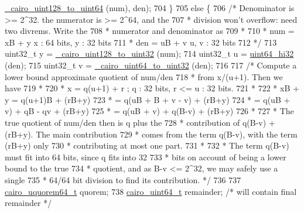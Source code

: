 \begin{DoxyCode}
      \hyperlink{cairo-wideint-private_8h_a9a76ef52b513bb1b8dad9c401d707084}{\_cairo\_uint128\_to\_uint64} (num), den);
704     \}
705     \textcolor{keywordflow}{else} \{
706         \textcolor{comment}{/* Denominator is >= 2^32. the numerator is >= 2^64, and the}
707 \textcolor{comment}{         * division won't overflow: need two divrems.  Write the}
708 \textcolor{comment}{         * numerator and denominator as}
709 \textcolor{comment}{         *}
710 \textcolor{comment}{         *      num = xB + y            x : 64 bits, y : 32 bits}
711 \textcolor{comment}{         *      den = uB + v            u, v : 32 bits}
712 \textcolor{comment}{         */}
713         uint32\_t y = \hyperlink{cairo-wideint-private_8h_ae551218d118f6f92efe5e80727cfb49c}{\_cairo\_uint128\_to\_uint32} (num);
714         uint32\_t u = \hyperlink{cairo-wideint_8c_a8140801e22e4b973bf94d6e94680f96e}{uint64\_hi32} (den);
715         uint32\_t v = \hyperlink{cairo-wideint-private_8h_a061bc60ff1861b1bc47c7e344f5557dd}{\_cairo\_uint64\_to\_uint32} (den);
716 
717         \textcolor{comment}{/* Compute a lower bound approximate quotient of num/den}
718 \textcolor{comment}{         * from x/(u+1).  Then we have}
719 \textcolor{comment}{         *}
720 \textcolor{comment}{         * x    = q(u+1) + r    ; q : 32 bits, r <= u : 32 bits.}
721 \textcolor{comment}{         *}
722 \textcolor{comment}{         * xB + y       = q(u+1)B       + (rB+y)}
723 \textcolor{comment}{         *              = q(uB + B + v - v) + (rB+y)}
724 \textcolor{comment}{         *              = q(uB + v)     + qB - qv + (rB+y)}
725 \textcolor{comment}{         *              = q(uB + v)     + q(B-v) + (rB+y)}
726 \textcolor{comment}{         *}
727 \textcolor{comment}{         * The true quotient of num/den then is q plus the}
728 \textcolor{comment}{         * contribution of q(B-v) + (rB+y).  The main contribution}
729 \textcolor{comment}{         * comes from the term q(B-v), with the term (rB+y) only}
730 \textcolor{comment}{         * contributing at most one part.}
731 \textcolor{comment}{         *}
732 \textcolor{comment}{         * The term q(B-v) must fit into 64 bits, since q fits into 32}
733 \textcolor{comment}{         * bits on account of being a lower bound to the true}
734 \textcolor{comment}{         * quotient, and as B-v <= 2^32, we may safely use a single}
735 \textcolor{comment}{         * 64/64 bit division to find its contribution. */}
736 
737         \hyperlink{struct__cairo__uquorem64}{cairo\_uquorem64\_t} quorem;
738         \hyperlink{cairo-wideint-private_8h_addac97960d28a0f1b58a5abefd21b14b}{cairo\_uint64\_t} remainder; \textcolor{comment}{/* will contain final remainder */}

\end{DoxyCode}
